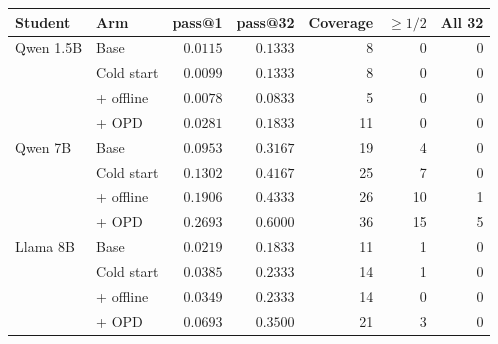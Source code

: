 \begin{tabular}{llrrrrr}
\toprule
Student & Arm & pass@1 & pass@32 & Coverage & $\ge 1/2$ & All 32\\
\midrule
Qwen 1.5B & Base & $0.0115$ & $0.1333$ & 8 & 0 & 0\\
 & Cold start & $0.0099$ & $0.1333$ & 8 & 0 & 0\\
 & + offline & $0.0078$ & $0.0833$ & 5 & 0 & 0\\
 & + OPD & $0.0281$ & $0.1833$ & 11 & 0 & 0\\
\midrule
Qwen 7B & Base & $0.0953$ & $0.3167$ & 19 & 4 & 0\\
 & Cold start & $0.1302$ & $0.4167$ & 25 & 7 & 0\\
 & + offline & $0.1906$ & $0.4333$ & 26 & 10 & 1\\
 & + OPD & $0.2693$ & $0.6000$ & 36 & 15 & 5\\
\midrule
Llama 8B & Base & $0.0219$ & $0.1833$ & 11 & 1 & 0\\
 & Cold start & $0.0385$ & $0.2333$ & 14 & 1 & 0\\
 & + offline & $0.0349$ & $0.2333$ & 14 & 0 & 0\\
 & + OPD & $0.0693$ & $0.3500$ & 21 & 3 & 0\\
\bottomrule
\end{tabular}
